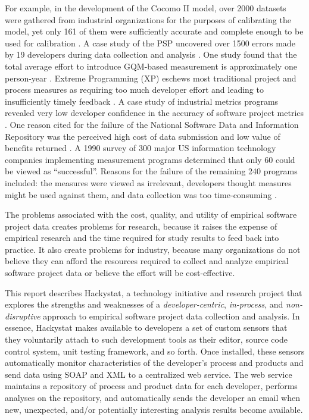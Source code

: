 For example, in the development of the Cocomo II model, over 2000 datasets
were gathered from industrial organizations for the purposes of calibrating
the model, yet only 161 of them were sufficiently accurate and complete
enough to be used for calibration \cite{Boehm01}.  A case study of the PSP
uncovered over 1500 errors made by 19 developers during data collection and
analysis \cite{csdl-98-13}.  One study found that the total average effort
to introduce GQM-based measurement is approximately one person-year
\cite{Fuggetta98}.  Extreme Programming (XP) eschews most traditional
project and process measures as requiring too much developer effort and
leading to insufficiently timely feedback \cite{Jeffries01}. A case study
of industrial metrics programs revealed very low developer confidence in
the accuracy of software project metrics \cite{Hall97}. One reason cited
for the failure of the National Software Data and Information Repository
was the perceived high cost of data submission and low value of benefits
returned \cite{Goth01}.  A 1990 survey of 300 major US information
technology companies implementing measurement programs determined that only
60 could be viewed as ``successful''. Reasons for the failure of the
remaining 240 programs included: the measures were viewed as irrelevant,
developers thought measures might be used against them, and data collection
was too time-consuming \cite{Rubin90}.

The problems associated with the cost, quality, and utility of empirical
software project  data creates problems for research, because it raises
the expense of empirical research and the time required for study results
to feed back into practice.  It also create problems for industry, because
many organizations do not believe they can afford the resources required to
collect and analyze empirical software project data or believe the effort
will be cost-effective.

This report describes Hackystat, a technology initiative and research
project that explores the strengths and weaknesses of a {\em
  developer-centric}, {\em in-process}, and {\em non-disruptive} approach
to empirical software project data collection and analysis. In essence,
Hackystat makes available to developers a set of custom sensors that they
voluntarily attach to such development tools as their editor, source code
control system, unit testing framework, and so forth.  Once installed,
these sensors automatically monitor characteristics of the developer's
process and products and send data using SOAP and XML to a centralized web
service.  The web service maintains a repository of process and product
data for each developer, performs analyses on the repository, and
automatically sends the developer an email when new, unexpected, and/or
potentially interesting analysis results become available.

